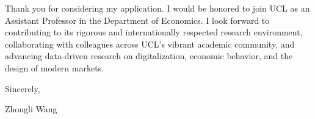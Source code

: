 \documentclass{nfr}
\begin{document}
Thank you for considering my application. 
I would be honored to join UCL as an Assistant Professor in the Department of Economics. 
I look forward to contributing to its rigorous and internationally respected research environment, collaborating with colleagues across UCL’s vibrant academic community, and advancing data-driven research on digitalization, economic behavior, and the design of modern markets.
\vspace{3mm}

\noindent Sincerely,\\
\vspace{10mm}

\noindent Zhongli Wang

\vspace{5mm}



\end{document}
